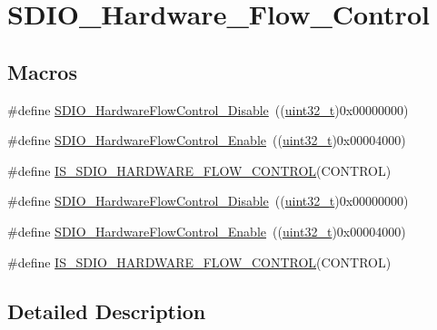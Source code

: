\hypertarget{group___s_d_i_o___hardware___flow___control}{}\section{S\+D\+I\+O\+\_\+\+Hardware\+\_\+\+Flow\+\_\+\+Control}
\label{group___s_d_i_o___hardware___flow___control}
\subsection*{Macros}
\begin{DoxyCompactItemize}
\item 
\#define \hyperlink{group___s_d_i_o___hardware___flow___control_ga7529a3c8a11ac685bde4aafa12c8a977}{S\+D\+I\+O\+\_\+\+Hardware\+Flow\+Control\+\_\+\+Disable}~((\hyperlink{_p_e___types_8h_a33594304e786b158f3fb30289278f5af}{uint32\+\_\+t})0x00000000)
\item 
\#define \hyperlink{group___s_d_i_o___hardware___flow___control_gab6cfef6778d829f3dcefc6c2bad7c9aa}{S\+D\+I\+O\+\_\+\+Hardware\+Flow\+Control\+\_\+\+Enable}~((\hyperlink{_p_e___types_8h_a33594304e786b158f3fb30289278f5af}{uint32\+\_\+t})0x00004000)
\item 
\#define \hyperlink{group___s_d_i_o___hardware___flow___control_gad8be549f8348479d064dff21343ae411}{I\+S\+\_\+\+S\+D\+I\+O\+\_\+\+H\+A\+R\+D\+W\+A\+R\+E\+\_\+\+F\+L\+O\+W\+\_\+\+C\+O\+N\+T\+R\+OL}(C\+O\+N\+T\+R\+OL)
\item 
\#define \hyperlink{group___s_d_i_o___hardware___flow___control_ga7529a3c8a11ac685bde4aafa12c8a977}{S\+D\+I\+O\+\_\+\+Hardware\+Flow\+Control\+\_\+\+Disable}~((\hyperlink{_p_e___types_8h_a33594304e786b158f3fb30289278f5af}{uint32\+\_\+t})0x00000000)
\item 
\#define \hyperlink{group___s_d_i_o___hardware___flow___control_gab6cfef6778d829f3dcefc6c2bad7c9aa}{S\+D\+I\+O\+\_\+\+Hardware\+Flow\+Control\+\_\+\+Enable}~((\hyperlink{_p_e___types_8h_a33594304e786b158f3fb30289278f5af}{uint32\+\_\+t})0x00004000)
\item 
\#define \hyperlink{group___s_d_i_o___hardware___flow___control_gad8be549f8348479d064dff21343ae411}{I\+S\+\_\+\+S\+D\+I\+O\+\_\+\+H\+A\+R\+D\+W\+A\+R\+E\+\_\+\+F\+L\+O\+W\+\_\+\+C\+O\+N\+T\+R\+OL}(C\+O\+N\+T\+R\+OL)
\end{DoxyCompactItemize}


\subsection{Detailed Description}


